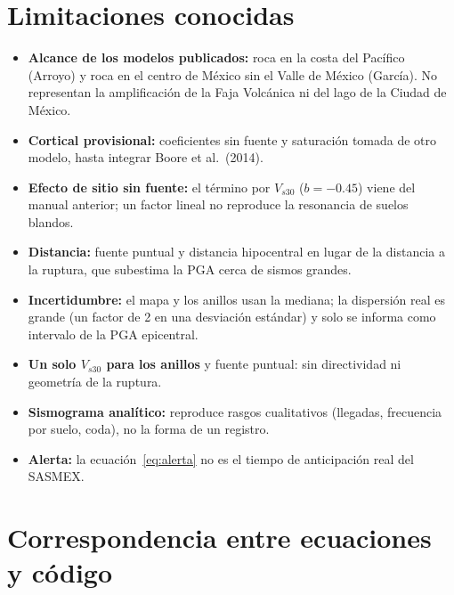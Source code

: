 \documentclass[11pt,a4paper]{article}
\begin{document}
\section{Limitaciones conocidas}
\label{sec:limitaciones}

\begin{itemize}
  \item \textbf{Alcance de los modelos publicados:} roca en la costa del Pacífico (Arroyo) y roca en
        el centro de México sin el Valle de México (García). No representan la amplificación de la
        Faja Volcánica ni del lago de la Ciudad de México.
  \item \textbf{Cortical provisional:} coeficientes sin fuente y saturación tomada de otro modelo, hasta
        integrar Boore et al.\ (2014).
  \item \textbf{Efecto de sitio sin fuente:} el término por $V_{s30}$ ($b = -0.45$) viene del manual
        anterior; un factor lineal no reproduce la resonancia de suelos blandos.
  \item \textbf{Distancia:} fuente puntual y distancia hipocentral en lugar de la distancia a la
        ruptura, que subestima la PGA cerca de sismos grandes.
  \item \textbf{Incertidumbre:} el mapa y los anillos usan la mediana; la dispersión real es grande
        (un factor de 2 en una desviación estándar) y solo se informa como intervalo de la PGA
        epicentral.
  \item \textbf{Un solo $V_{s30}$ para los anillos} y fuente puntual: sin directividad ni geometría de la
        ruptura.
  \item \textbf{Sismograma analítico:} reproduce rasgos cualitativos (llegadas, frecuencia por suelo,
        coda), no la forma de un registro.
  \item \textbf{Alerta:} la ecuación~\eqref{eq:alerta} no es el tiempo de anticipación real del SASMEX.
\end{itemize}

\section{Correspondencia entre ecuaciones y código}
\end{document}
